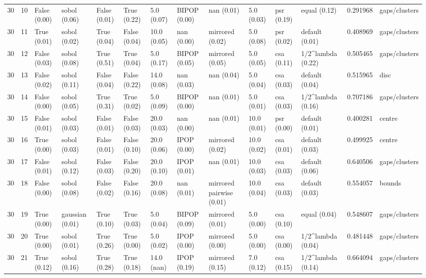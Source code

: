 \begin{tabular}{rlllllllllllrl}
30 & 10 & False (0.00) & sobol (0.06) & False (0.01) & True (0.22) & 5.0 (0.07) & BIPOP (0.00) & nan (0.01) & 5.0 (0.03) & psr (0.19) & equal (0.12) & 0.291968 & gaps/clusters \\
30 & 11 & True (0.01) & sobol (0.02) & True (0.04) & False (0.04) & 10.0 (0.05) & nan (0.00) & mirrored (0.02) & 5.0 (0.08) & psr (0.02) & default (0.01) & 0.408969 & gaps/clusters \\
30 & 12 & False (0.03) & sobol (0.08) & True (0.51) & True (0.04) & 5.0 (0.17) & BIPOP (0.05) & mirrored (0.05) & 5.0 (0.05) & csa (0.11) & 1/2^lambda (0.22) & 0.505465 & gaps/clusters \\
30 & 13 & False (0.02) & sobol (0.11) & False (0.04) & False (0.22) & 14.0 (0.08) & nan (0.03) & nan (0.04) & 5.0 (0.04) & csa (0.03) & default (0.04) & 0.515965 & disc \\
30 & 14 & False (0.00) & sobol (0.05) & True (0.31) & True (0.02) & 5.0 (0.09) & BIPOP (0.00) & nan (0.01) & 5.0 (0.01) & csa (0.03) & 1/2^lambda (0.16) & 0.707186 & gaps/clusters \\
30 & 15 & False (0.01) & sobol (0.03) & False (0.01) & False (0.03) & 20.0 (0.03) & nan (0.00) & nan (0.01) & 10.0 (0.01) & psr (0.00) & default (0.01) & 0.400281 & centre \\
30 & 16 & True (0.00) & sobol (0.03) & False (0.01) & False (0.10) & 20.0 (0.06) & IPOP (0.00) & mirrored (0.02) & 10.0 (0.02) & csa (0.01) & default (0.03) & 0.499925 & centre \\
30 & 17 & False (0.01) & sobol (0.12) & False (0.03) & False (0.20) & 20.0 (0.10) & IPOP (0.01) & nan (0.01) & 10.0 (0.03) & csa (0.03) & default (0.06) & 0.640506 & gaps/clusters \\
30 & 18 & False (0.00) & sobol (0.08) & False (0.02) & False (0.16) & 20.0 (0.08) & nan (0.01) & mirrored pairwise (0.01) & 10.0 (0.04) & csa (0.03) & default (0.03) & 0.554057 & bounds \\
30 & 19 & True (0.00) & gaussian (0.01) & True (0.10) & True (0.03) & 5.0 (0.04) & BIPOP (0.09) & mirrored (0.01) & 5.0 (0.00) & csa (0.10) & equal (0.04) & 0.548607 & gaps/clusters \\
30 & 20 & True (0.00) & sobol (0.01) & True (0.26) & True (0.00) & 5.0 (0.02) & IPOP (0.00) & mirrored (0.00) & 5.0 (0.00) & csa (0.00) & 1/2^lambda (0.04) & 0.481448 & gaps/clusters \\
30 & 21 & True (0.12) & sobol (0.16) & True (0.28) & True (0.18) & 14.0 (nan) & IPOP (0.19) & mirrored (0.15) & 7.0 (0.12) & csa (0.15) & 1/2^lambda (0.14) & 0.664094 & gaps/clusters \\

\end{tabular}
